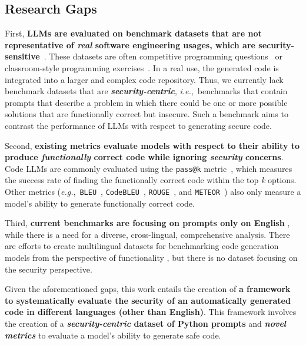 \documentclass[pdflatex,sn-mathphys-ay]{sn-jnl}
\newcommand{\ie}{\textit{i.e.},\ }
\newcommand{\eg}{\textit{e.g.},\ }
\begin{document}
\subsection{Research Gaps}\label{subsec:Gaps}




% 
First, \textbf{LLMs are evaluated on benchmark datasets that are not representative of \textit{real} software engineering usages, which are security-sensitive}~\cite{CoderEval}. These datasets are often competitive programming questions~\cite{APPS,alphaCode} or classroom-style programming exercises~\cite{MBPP,DS1000,DSP,HumanEval,MBXP,raihan2024cseprompts,raihan2025performance}. 
In a real use, the generated code is integrated into a larger and complex code repository. Thus, we currently lack benchmark datasets that are \textbf{\textit{security-centric}}, \ie benchmarks that contain prompts that describe a problem in which there could be one or more possible solutions that are functionally correct but insecure. Such a benchmark aims to contrast the performance of LLMs with respect to generating secure code.

Second, \textbf{existing metrics evaluate models with respect to their ability to produce \emph{functionally} correct code while ignoring \textit{security} concerns}. Code LLMs are commonly evaluated using the \texttt{pass@k} metric~\cite{HumanEval}, which measures the success rate of finding the functionally correct code within the top \textit{k} options. Other metrics (\eg \texttt{BLEU}~\cite{BLEU}, \texttt{CodeBLEU}~\cite{CodeBLEU}, \texttt{ROUGE}~\cite{ROUGE}, and \texttt{METEOR}~\cite{METEOR}) also only measure a model's ability to generate functionally correct code. 


Third, \textbf{current benchmarks are focusing on prompts only on English} \cite{peng-etal-2024-humaneval,raihan2024cseprompts}, while there is a need for a diverse, cross-lingual, comprehensive analysis. There are efforts to create multilingual datasets for benchmarking code generation models from the perspective of functionality \cite{peng-etal-2024-humaneval,multiple,raihan2025mhumaneval}, but there is no dataset focusing on the security perspective.

Given the aforementioned gaps, this work entails the creation of \textbf{a framework to systematically evaluate the security of an automatically generated code in different languages (other than English)}. This framework involves the creation of a  \textbf{\textit{security-centric} dataset of Python prompts} and  \textit{\textbf{novel metrics}} to evaluate a model's ability to generate safe code. 
\end{document}
